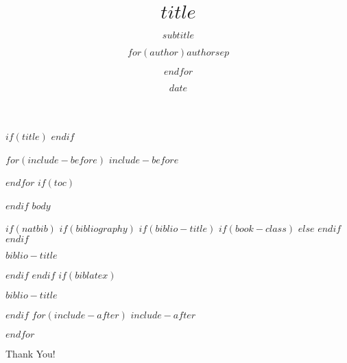 \documentclass[$if(fontsize)$$fontsize$,$endif$$if(lang)$$babel-lang$,$endif$$if(handout)$handout,$endif$$if(beamer)$ignorenonframetext,$endif$$for(classoption)$$classoption$$sep$,$endfor$$if(make149)$,aspectratio=149$endif$]{$documentclass$}
\title{$title$}
\subtitle{$subtitle$}
\author{$for(author)$$author$$sep$ \and $endfor$}
\date{$date$}
\begin{document}
$if(title)$
\frame{\titlepage}
$endif$

$for(include-before)$
$include-before$

$endfor$
$if(toc)$
\begin{frame}
\tableofcontents[hideallsubsections]
\end{frame}

$endif$
$body$

$if(natbib)$
$if(bibliography)$
$if(biblio-title)$
$if(book-class)$
\renewcommand\bibname{$biblio-title$}
$else$
\renewcommand\refname{$biblio-title$}
$endif$
$endif$
\begin{frame}[allowframebreaks]{$biblio-title$}

\end{frame}

$endif$
$endif$
$if(biblatex)$
\begin{frame}[allowframebreaks]{$biblio-title$}
\printbibliography[heading=none]
\end{frame}

$endif$
$for(include-after)$
$include-after$

$endfor$


\begin{frame}
\begin{center}
\textcolor{tamumaroon}{\Huge Thank You!}
\end{center}
\end{frame}
\end{document}
